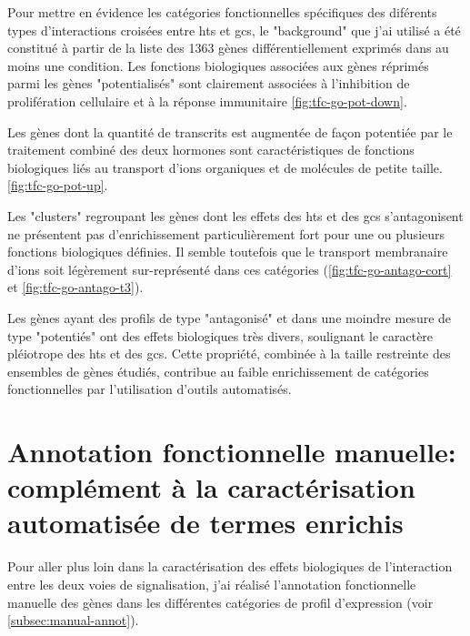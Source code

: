\documentclass[../main.tex]{subfiles}
\begin{document}


Pour mettre en évidence les catégories fonctionnelles spécifiques des diférents types d'interactions croisées entre \glspl{ht} et \glspl{gc}, le "background" que j'ai utilisé a été constitué à partir de la liste des 1363 gènes différentiellement exprimés dans au moins une condition.
Les fonctions biologiques associées aux gènes réprimés parmi les gènes "potentialisés" sont clairement associées à l'inhibition de prolifération cellulaire et à la réponse immunitaire  \autoref{fig:tfc-go-pot-down}.



Les gènes dont la quantité de transcrits est augmentée de façon potentiée par le traitement combiné des deux hormones sont caractéristiques de fonctions biologiques liés au transport d'ions organiques et de molécules de petite taille. \autoref{fig:tfc-go-pot-up}.



Les "clusters" regroupant les gènes dont les effets des \glspl{ht} et des \glspl{gc} s'antagonisent ne présentent pas d'enrichissement particulièrement fort pour une ou plusieurs fonctions biologiques définies.
Il semble toutefois que le transport membranaire d'ions soit légèrement sur-représenté dans ces catégories (\autoref{fig:tfc-go-antago-cort} et \autoref{fig:tfc-go-antago-t3}).





Les gènes ayant des profils de type "antagonisé" et dans une moindre mesure de type "potentiés" ont des effets biologiques très divers, soulignant le caractère pléiotrope des \glspl{ht} et des \glspl{gc}.
Cette propriété, combinée à la taille restreinte des ensembles de gènes étudiés, contribue au faible enrichissement de catégories fonctionnelles par l'utilisation d'outils automatisés.


\section{Annotation fonctionnelle manuelle: complément à la caractérisation automatisée de termes enrichis}

Pour aller plus loin dans la caractérisation des effets biologiques de l'interaction entre les deux voies de signalisation, j'ai réalisé l'annotation fonctionnelle manuelle des gènes dans les différentes catégories de profil d'expression (voir \autoref{subsec:manual-annot}).
\end{document}
